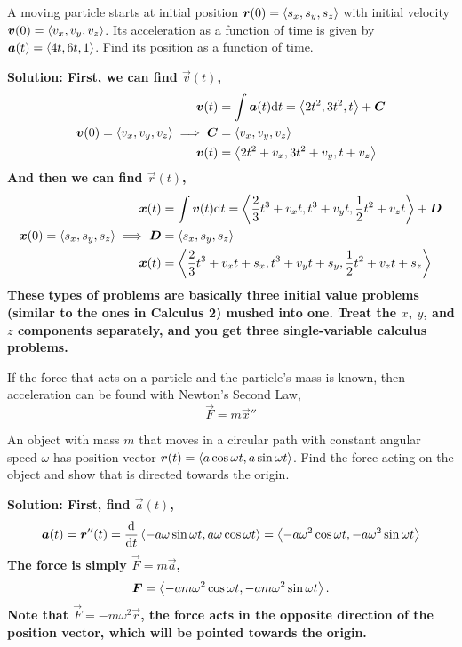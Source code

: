 \begin{example}
    A moving particle starts at initial position \(\boldsymbol{r}(0) = \left\langle s_x, s_y, s_z \right\rangle\) with initial velocity \(\boldsymbol{v}(0) = \left\langle v_x, v_y, v_z \right\rangle\). Its acceleration as a function of time is given by \(\boldsymbol{a}(t)=\left\langle4t, 6t, 1\right\rangle\). Find its position as a function of time.\par
    \bf{Solution:} First, we can find \(\vec v(t)\),
    \begin{align*}
        \boldsymbol{v}(t) &=  \int \boldsymbol{a}(t) \dd t = \left\langle2t^2, 3t^2, t\right\rangle + \boldsymbol{C} \\
        \boldsymbol{v}(0) = \left\langle v_x, v_y, v_z\right\rangle\implies \boldsymbol{C} &= \left\langle v_x, v_y, v_z\right\rangle \\
        \boldsymbol{v}(t) &= \left\langle 2t^2+v_x, 3t^2+v_y, t+v_z\right\rangle
    \end{align*}
    And then we can find \(\vec r(t)\),
    \begin{align*}
        \boldsymbol{x}(t) &= \int \boldsymbol{v}(t) \dd t = \left\langle \frac{2}{3}t^3 + v_xt, t^3+v_yt, \frac{1}{2}t^2+v_zt\right\rangle + \boldsymbol{D} \\
        \boldsymbol{x}(0) = \left\langle s_x, s_y, s_z\right\rangle\implies \boldsymbol{D} &= \left\langle s_x, s_y, s_z\right\rangle \\
        \boldsymbol{x}(t) &= \left\langle\frac{2}{3}t^3+v_xt+s_x, t^3+v_yt+s_y, \frac{1}{2}t^2+v_zt+s_z\right\rangle
    \end{align*}
    These types of problems are basically three initial value problems (similar to the ones in Calculus 2) mushed into one. Treat the \(x\), \(y\), and \(z\) components separately, and you get three single-variable calculus problems.
\end{example}
If the force that acts on a particle and the particle's mass is known, then acceleration can be found with Newton's Second Law,
\[ \vec F = m \vec x'' \]
\begin{example}
    An object with mass \(m\) that moves in a circular path with constant angular speed \(\omega\) has position vector \(\boldsymbol{r}(t) = \left\langle a\cos \omega t, a\sin \omega t\right\rangle\). Find the force acting on the object and show that is directed towards the origin. \par\bf{Solution: }First, find \(\vec a(t)\),
    \[ \boldsymbol{a}(t) = \boldsymbol{r}''(t) = \dv{t}\left\langle-a\omega \sin \omega t, a\omega\cos \omega t\right\rangle = \left\langle -a\omega^2\cos \omega t, -a\omega^2\sin \omega t \right\rangle \]
    The force is simply \(\vec F = m \vec a\),
    \[ \boldsymbol{F} = \left\langle -am\omega^2\cos \omega t, -am\omega^2\sin\omega t\right\rangle.\]
    Note that \(\vec F = -m\omega^2\vec r\), the force acts in the opposite direction of the position vector, which will be pointed towards the origin.
\end{example}
